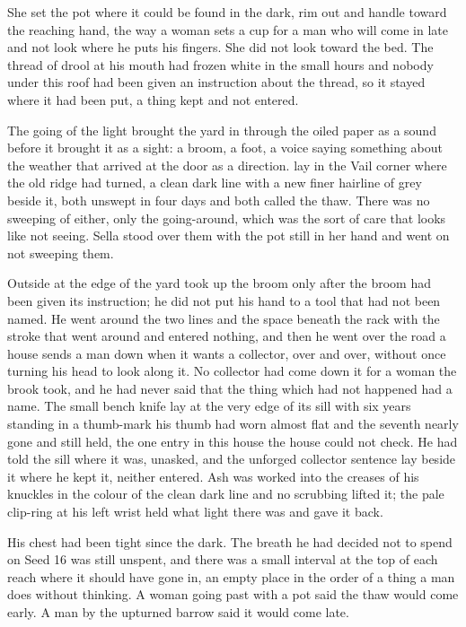 She set the pot where it could be found in the dark, rim out and handle toward the reaching hand, the way a woman sets a cup for a man who will come in late and not look where he puts his fingers. She did not look toward the bed. The thread of drool at his mouth had frozen white in the small hours and nobody under this roof had been given an instruction about the thread, so it stayed where it had been put, a thing kept and not entered.

The going of the light brought the yard in through the oiled paper as a sound before it brought it as a sight: a broom, a foot, a voice saying something about the weather that arrived at the door as a direction.  lay in the Vail corner where the old ridge had turned, a clean dark line with a new finer hairline of grey beside it, both unswept in four days and both called the thaw. There was no sweeping of either, only the going-around, which was the sort of care that looks like not seeing. Sella stood over them with the pot still in her hand and went on not sweeping them.

\scenebreak

Outside at the edge of the yard  took up the broom only after the broom had been given its instruction; he did not put his hand to a tool that had not been named. He went around the two lines and the space beneath the rack with the stroke that went around and entered nothing, and then he went over the road a house sends a man down when it wants a collector, over and over, without once turning his head to look along it. No collector had come down it for a woman the brook took, and he had never said that the thing which had not happened had a name. The small bench knife lay at the very edge of its sill with six years standing in a thumb-mark his thumb had worn almost flat and the seventh nearly gone and still held, the one entry in this house the house could not check. He had told the sill where it was, unasked, and the unforged collector sentence lay beside it where he kept it, neither entered. Ash was worked into the creases of his knuckles in the colour of the clean dark line and no scrubbing lifted it; the pale clip-ring at his left wrist held what light there was and gave it back.

His chest had been tight since the dark. The breath he had decided not to spend on Seed 16 was still unspent, and there was a small interval at the top of each reach where it should have gone in, an empty place in the order of a thing a man does without thinking. A woman going past with a pot said the thaw would come early. A man by the upturned barrow said it would come late.

